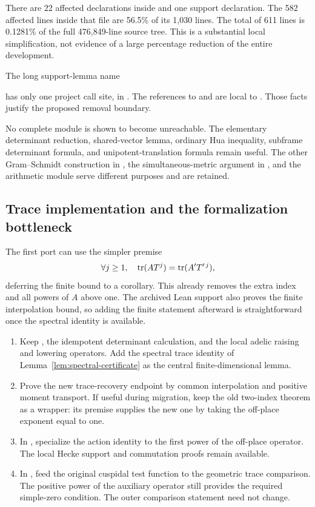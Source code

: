 There are 22 affected declarations inside  and one support
declaration. The 582 affected lines inside that file are 56.5\% of its 1,030 lines.
The total of 611 lines is 0.1281\% of the full 476,849-line source tree.
This is a substantial local simplification, not evidence of a large percentage
reduction of the entire development.

The long support-lemma name
\begin{quote}\small{}\end{quote}
has only one project call site, in .
The references to  and  are local to
. Those facts justify the proposed removal boundary.

No complete module is shown to become unreachable. The elementary determinant
reduction, shared-vector lemma, ordinary Hua inequality, subframe determinant
formula, and unipotent-translation formula remain useful. The other Gram--Schmidt
construction in , the simultaneous-metric argument in
, and the arithmetic module
 serve different purposes and are retained.

\subsection{Trace implementation and the formalization bottleneck}

The first port can use the simpler premise
\[
 \forall j\geq1,\quad \operatorname{tr}(AT^j)=\operatorname{tr}(A'T'^{\,j}),
\]
deferring the finite bound to a corollary. This already removes the extra index
and all powers of \(A\) above one. The archived Lean support also proves the
finite interpolation bound, so adding the finite statement afterward is straightforward
once the spectral identity is available.

\begin{enumerate}
\item Keep , the idempotent determinant calculation, and
the local adelic raising and lowering operators. Add the spectral trace identity
of Lemma~\ref{lem:spectral-certificate} as the central finite-dimensional lemma.
\item Prove the new trace-recovery endpoint by common interpolation and positive
moment transport. If useful during migration, keep the old two-index theorem
as a wrapper: its premise supplies the new one by taking the off-place exponent
equal to one.
\item In , specialize the action
identity to the first power of the off-place operator. The local Hecke support
and commutation proofs remain available.
\item In , feed the original
cuspidal test function to the geometric trace comparison. The positive power
of the auxiliary operator still provides the required simple-zero condition.
The outer comparison statement need not change.
\end{enumerate}

